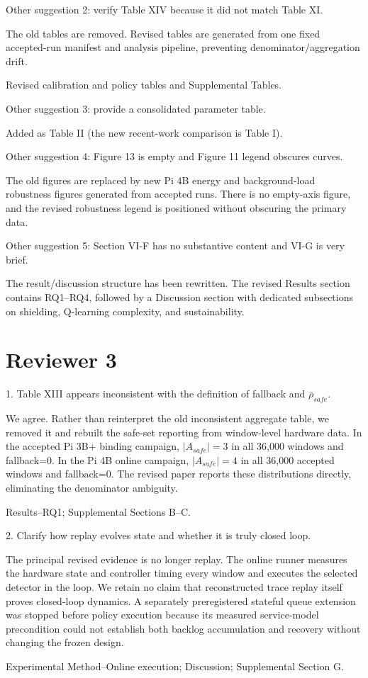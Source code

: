 \documentclass[11pt,a4paper]{article}
\newcommand{\commentbox}[1]{\begin{rcommentbox}#1\end{rcommentbox}}
\newcommand{\responsebox}[1]{\begin{authorresponsebox}#1\end{authorresponsebox}}
\newcommand{\changebox}[1]{\begin{wherebox}#1\end{wherebox}}
\begin{document}
\commentbox{Other suggestion 2: verify Table XIV because it did not match Table XI.}
\responsebox{The old tables are removed. Revised tables are generated from one fixed accepted-run manifest and analysis pipeline, preventing denominator/aggregation drift.}
\changebox{Revised calibration and policy tables and Supplemental Tables.}

\commentbox{Other suggestion 3: provide a consolidated parameter table.}
\responsebox{Added as Table II (the new recent-work comparison is Table I).}

\commentbox{Other suggestion 4: Figure 13 is empty and Figure 11 legend obscures curves.}
\responsebox{The old figures are replaced by new Pi 4B energy and background-load robustness figures generated from accepted runs. There is no empty-axis figure, and the revised robustness legend is positioned without obscuring the primary data.}

\commentbox{Other suggestion 5: Section VI-F has no substantive content and VI-G is very brief.}
\responsebox{The result/discussion structure has been rewritten. The revised Results section contains RQ1--RQ4, followed by a Discussion section with dedicated subsections on shielding, Q-learning complexity, and sustainability.}

\section*{Reviewer 3}

\commentbox{1. Table XIII appears inconsistent with the definition of fallback and $\bar\rho_{safe}$.}
\responsebox{We agree. Rather than reinterpret the old inconsistent aggregate table, we removed it and rebuilt the safe-set reporting from window-level hardware data. In the accepted Pi 3B+ binding campaign, $|A_{safe}|=3$ in all 36,000 windows and fallback=0. In the Pi 4B online campaign, $|A_{safe}|=4$ in all 36,000 accepted windows and fallback=0. The revised paper reports these distributions directly, eliminating the denominator ambiguity.}
\changebox{Results--RQ1; Supplemental Sections B--C.}

\commentbox{2. Clarify how replay evolves state and whether it is truly closed loop.}
\responsebox{The principal revised evidence is no longer replay. The online runner measures the hardware state and controller timing every window and executes the selected detector in the loop. We retain no claim that reconstructed trace replay itself proves closed-loop dynamics. A separately preregistered stateful queue extension was stopped before policy execution because its measured service-model precondition could not establish both backlog accumulation and recovery without changing the frozen design.}
\changebox{Experimental Method--Online execution; Discussion; Supplemental Section G.}
\end{document}
